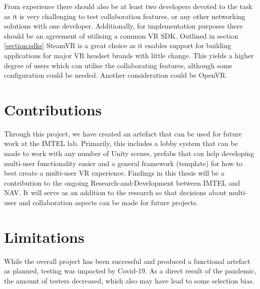 From experience there should also be at least two developers devoted to the task as it is very challenging to test collaboration features, or any other networking solutions with one developer. Additionally, for implementation purposes there should be an agreement of utilising a common VR SDK. Outlined in section \ref{section:sdks} SteamVR is a great choice as it enables support for building applications for major VR headset brands with little change. This yields a higher degree of users which can utilise the collaborating features, although some configuration could be needed. Another consideration could be OpenVR.







\section{Contributions}
Through this project, we have created an artefact that can be used for future work at the IMTEL lab. Primarily, this includes a lobby system that can be made to work with any number of Unity scenes, prefabs that can help developing multi-user functionality easier and a general framework (template) for how to best create a multi-user VR experience. 
Findings in this thesis will be a contribution to the ongoing Research-and-Development between IMTEL and NAV. It will serve as an addition to the research so that decisions about multi-user and collaboration aspects can be made for future projects.   







\section{Limitations}
While the overall project has been successful and produced a functional artefact as planned, testing was impacted by Covid-19. As a direct result of the pandemic, the amount of testers decreased, which also may have lead to some selection bias.

